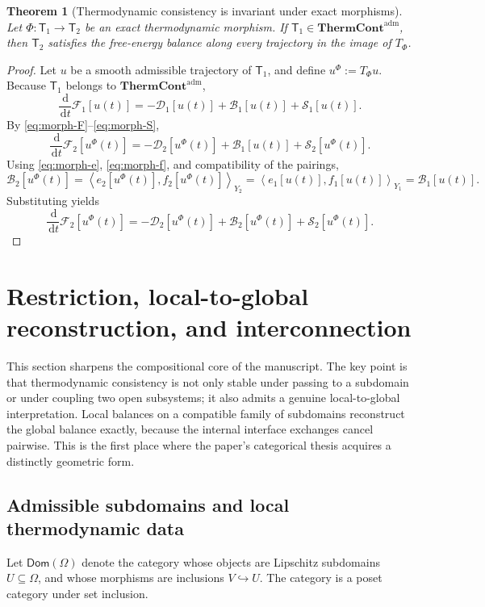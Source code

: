 \documentclass[11pt]{article}
\newtheorem{theorem}{Theorem}[section]
\newcommand{\Om}{\Omega}
\newcommand{\dd}{\,\mathrm{d}}
\newcommand{\F}{\mathcal{F}}
\newcommand{\Diss}{\mathcal{D}}
\newcommand{\Bnd}{\mathcal{B}}
\newcommand{\Src}{\mathcal{S}}
\newcommand{\ThermAdm}{\mathbf{ThermCont}^{\mathrm{adm}}}
\newcommand{\pair}[2]{\left\langle #1,#2\right\rangle}
\begin{document}
\begin{theorem}[Thermodynamic consistency is invariant under exact morphisms]
\label{thm:invariance}
Let \(\Phi:\mathsf{T}_1\to\mathsf{T}_2\) be an exact thermodynamic morphism. If
\(\mathsf{T}_1\in\ThermAdm\), then \(\mathsf{T}_2\) satisfies the free-energy balance
along every trajectory in the image of \(T_\Phi\).
\end{theorem}

\begin{proof}
Let \(u\) be a smooth admissible trajectory of \(\mathsf{T}_1\), and define
\(u^\Phi:=T_\Phi u\). Because \(\mathsf{T}_1\) belongs to \(\ThermAdm\),
\[
\frac{\dd}{\dd t}\F_1[u(t)]
=
-\Diss_1[u(t)] + \Bnd_1[u(t)] + \Src_1[u(t)].
\]
By \eqref{eq:morph-F}--\eqref{eq:morph-S},
\[
\frac{\dd}{\dd t}\F_2[u^\Phi(t)]
=
-\Diss_2[u^\Phi(t)] + \Bnd_1[u(t)] + \Src_2[u^\Phi(t)].
\]
Using \eqref{eq:morph-e}, \eqref{eq:morph-f}, and compatibility of the pairings,
\[
\Bnd_2[u^\Phi(t)]
=
\pair{e_2[u^\Phi(t)]}{f_2[u^\Phi(t)]}_{Y_2}
=
\pair{e_1[u(t)]}{f_1[u(t)]}_{Y_1}
=
\Bnd_1[u(t)].
\]
Substituting yields
\[
\frac{\dd}{\dd t}\F_2[u^\Phi(t)]
=
-\Diss_2[u^\Phi(t)] + \Bnd_2[u^\Phi(t)] + \Src_2[u^\Phi(t)].
\]
\end{proof}

\section{Restriction, local-to-global reconstruction, and interconnection}

This section sharpens the compositional core of the manuscript. The key point is that
thermodynamic consistency is not only stable under passing to a subdomain or under
coupling two open subsystems; it also admits a genuine local-to-global
interpretation. Local balances on a compatible family of subdomains reconstruct the
global balance exactly, because the internal interface exchanges cancel pairwise.
This is the first place where the paper's categorical thesis acquires a distinctly
geometric form.

\subsection{Admissible subdomains and local thermodynamic data}

Let \(\mathsf{Dom}(\Om)\) denote the category whose objects are Lipschitz subdomains
\(U\subseteq \Om\), and whose morphisms are inclusions \(V\hookrightarrow U\). The
category is a poset category under set inclusion.
\end{document}
